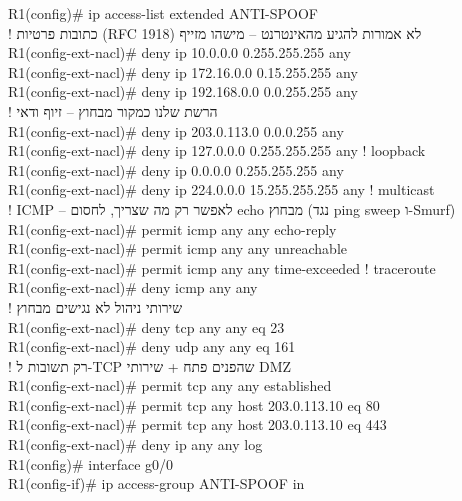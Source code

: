 \documentclass[11pt]{article}
\newcommand{\enLR}[1]{\textenglish{#1}}
\begin{document}
\begin{codebox}\begin{english}\codefont\footnotesize\color{cfg}\setlength{\parindent}{0pt}
R1(config)\# ip access-list extended ANTI-SPOOF\\
\textcolor{ccom}{\texthebrew{! כתובות פרטיות \enLR{(RFC 1918)} לא אמורות להגיע מהאינטרנט – מישהו מזייף}}\\
R1(config-ext-nacl)\# deny ip 10.0.0.0 0.255.255.255 any\\
R1(config-ext-nacl)\# deny ip 172.16.0.0 0.15.255.255 any\\
R1(config-ext-nacl)\# deny ip 192.168.0.0 0.0.255.255 any\\
\textcolor{ccom}{\texthebrew{! הרשת שלנו כמקור מבחוץ – זיוף ודאי}}\\
R1(config-ext-nacl)\# deny ip 203.0.113.0 0.0.0.255 any\\
R1(config-ext-nacl)\# deny ip 127.0.0.0 0.255.255.255 any     \textcolor{ccom}{\texthebrew{! \enLR{loopback}}}\\
R1(config-ext-nacl)\# deny ip 0.0.0.0 0.255.255.255 any\\
R1(config-ext-nacl)\# deny ip 224.0.0.0 15.255.255.255 any    \textcolor{ccom}{\texthebrew{! \enLR{multicast}}}\\
\textcolor{ccom}{\texthebrew{! \enLR{ICMP} – לאפשר רק מה שצריך, לחסום \enLR{echo} מבחוץ (נגד \enLR{ping sweep} ו-\enLR{Smurf)}}}\\
R1(config-ext-nacl)\# permit icmp any any echo-reply\\
R1(config-ext-nacl)\# permit icmp any any unreachable\\
R1(config-ext-nacl)\# permit icmp any any time-exceeded      \textcolor{ccom}{\texthebrew{! \enLR{traceroute}}}\\
R1(config-ext-nacl)\# deny icmp any any\\
\textcolor{ccom}{\texthebrew{! שירותי ניהול לא נגישים מבחוץ}}\\
R1(config-ext-nacl)\# deny tcp any any eq 23\\
R1(config-ext-nacl)\# deny udp any any eq 161\\
\textcolor{ccom}{\texthebrew{! רק תשובות ל-\enLR{TCP} שהפנים פתח + שירותי \enLR{DMZ}}}\\
R1(config-ext-nacl)\# permit tcp any any established\\
R1(config-ext-nacl)\# permit tcp any host 203.0.113.10 eq 80\\
R1(config-ext-nacl)\# permit tcp any host 203.0.113.10 eq 443\\
R1(config-ext-nacl)\# deny ip any any log\\
R1(config)\# interface g0/0\\
R1(config-if)\# ip access-group ANTI-SPOOF in
\end{english}\end{codebox}
\end{document}

